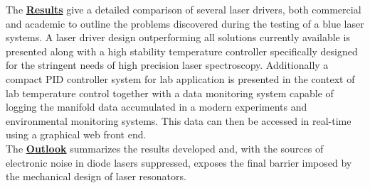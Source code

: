 The \hyperref[sec:results]{\textbf{Results}} give a detailed comparison of several laser drivers, both commercial and academic to outline the problems discovered during the testing of a blue laser systems. A laser driver design outperforming all solutions currently available is presented along with a high stability temperature controller specifically designed for the stringent needs of high precision laser spectroscopy. Additionally a compact PID controller system for lab application is presented in the context of lab temperature control together with a data monitoring system capable of logging the manifold data accumulated in a modern experiments and environmental monitoring systems. This data can then be accessed in real-time using a graphical web front end.\\

The \hyperref[sec:outlook]{\textbf{Outlook}} summarizes the results developed and, with the sources of electronic noise in diode lasers suppressed, exposes the final barrier imposed by the mechanical design of laser resonators.

